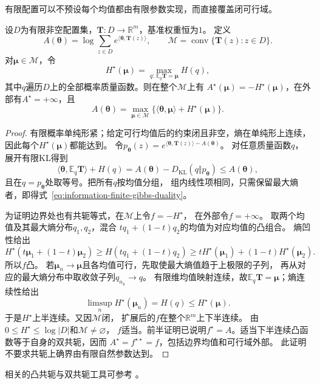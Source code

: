 有限配置可以不预设每个均值都由有限参数实现，而直接覆盖闭可行域。
\begin{theorem}[有限配置上的配分函数与最大熵对偶]
\label{thm:information-finite-entropy-duality}
设\(D\)为有限非空配置集，\(\bm T:D\to\mathbb R^m\)，基准权重恒为\(1\)。
定义
\[
  A(\bm\theta)=\log\sum_{z\in D}e^{\langle\bm\theta,\bm T(z)\rangle},
  \qquad\mathcal M=\operatorname{conv}\{\bm T(z):z\in D\}.
\]
对\(\bm\mu\in\mathcal M\)，令
\[
  H^\star(\bm\mu)=\max_{q:\,\mathbb E_q\bm T=\bm\mu}H(q),
\]
其中\(q\)遍历\(D\)上的全部概率质量函数。则在整个\(\mathcal M\)上有
\(A^\star(\bm\mu)=-H^\star(\bm\mu)\)，在外部有\(A^\star=+\infty\)，且
\begin{equation}
  A(\bm\theta)=\max_{\bm\mu\in\mathcal M}
  \{\langle\bm\theta,\bm\mu\rangle+H^\star(\bm\mu)\}.
  \label{eq:information-finite-gibbs-duality}
\end{equation}
\end{theorem}
\begin{proof}
有限概率单纯形紧；给定可行均值后的约束闭且非空，熵在单纯形上连续，
因此每个\(H^\star(\bm\mu)\)都能达到。
令\(p_{\bm\theta}(z)=e^{\langle\bm\theta,\bm T(z)\rangle-A(\bm\theta)}\)。
对任意质量函数\(q\)，展开有限KL得到
\[
  \langle\bm\theta,\mathbb E_q\bm T\rangle+H(q)
  =A(\bm\theta)-D_{\mathrm{KL}}(q\Vert p_{\bm\theta})
  \leq A(\bm\theta),
\]
且在\(q=p_{\bm\theta}\)处取等号。把所有\(q\)按均值分组，
组内线性项相同，只需保留最大熵者，即得式~\eqref{eq:information-finite-gibbs-duality}。

为证明边界处也有共轭等式，在\(\mathcal M\)上令\(f=-H^\star\)，
在外部令\(f=+\infty\)。
取两个均值及其最大熵分布\(q_1,q_2\)，混合
\(tq_1+(1-t)q_2\)的均值为对应均值的凸组合。
熵凹性给出
\[
  H^\star(t\bm\mu_1+(1-t)\bm\mu_2)
  \geq H(tq_1+(1-t)q_2)
  \geq tH^\star(\bm\mu_1)+(1-t)H^\star(\bm\mu_2).
\]
所以\(f\)凸。
若\(\bm\mu_n\to\bm\mu\)且各均值可行，先取使最大熵值趋于上极限的子列，
再从对应的最大熵分布中取收敛子列\(q_{n_k}\to q\)。
有限维均值映射连续，故\(\mathbb E_q\bm T=\bm\mu\)；熵连续性给出
\[
  \limsup_nH^\star(\bm\mu_n)=H(q)\leq H^\star(\bm\mu).
\]
于是\(H^\star\)上半连续。又因\(\mathcal M\)闭，
扩展后的\(f\)在整个\(\mathbb R^m\)上下半连续。
由\(0\leq H^\star\leq\log|D|\)和\(\mathcal M\neq\varnothing\)，
\(f\)适当。前半证明已说明\(f^\star=A\)。适当下半连续凸函数等于自身的双共轭，因而
\(A^\star=f^{\star\star}=f\)，包括边界均值和可行域外部。
此证明不要求共轭上确界由有限自然参数达到。
\end{proof}

相关的凸共轭与双共轭工具可参考
。

